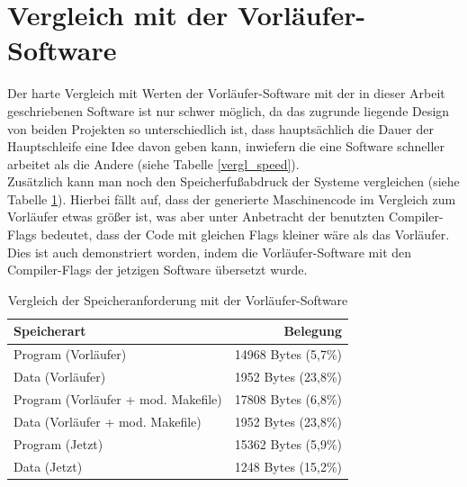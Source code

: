 \section{Vergleich mit der Vorläufer-Software}
Der harte Vergleich mit Werten der Vorläufer-Software mit der in dieser Arbeit geschriebenen Software ist
nur schwer möglich, da das zugrunde liegende Design von beiden Projekten so unterschiedlich ist, dass hauptsächlich
die Dauer der Hauptschleife eine Idee davon geben kann, inwiefern die eine Software schneller arbeitet als die Andere
(siehe Tabelle \ref{vergl_speed}).\\
Zusätzlich kann man noch den Speicherfußabdruck der Systeme vergleichen (siehe Tabelle \ref{vergl_speicher}). Hierbei
fällt auf, dass der generierte Maschinencode im Vergleich zum Vorläufer etwas größer ist, was aber unter Anbetracht
der benutzten Compiler-Flags bedeutet, dass der Code mit gleichen Flags kleiner wäre als das Vorläufer. Dies ist
auch demonstriert worden, indem die Vorläufer-Software mit den Compiler-Flags der jetzigen Software übersetzt
wurde.
\begin{table}[htb]
\begin{center}
	\begin{tabular}{|l||r|}
		\hline
		\textbf{Speicherart} & \textbf{Belegung} \\ \hline \hline
		Program (Vorläufer) & 14968 Bytes (5,7\%)  \\ \hline
		Data (Vorläufer)& 1952 Bytes (23,8\%) \\ \hline \hline
		Program (Vorläufer + mod. Makefile) & 17808 Bytes (6,8\%)  \\ \hline
		Data (Vorläufer + mod. Makefile) & 1952 Bytes (23,8\%) \\ \hline \hline
		Program (Jetzt)& 15362 Bytes (5,9\%) \\ \hline
		Data (Jetzt)& 1248 Bytes (15,2\%) \\ \hline
	\end{tabular}
	\caption{\label{vergl_speicher} Vergleich der Speicheranforderung mit der Vorläufer-Software}
\end{center}
\end{table}
